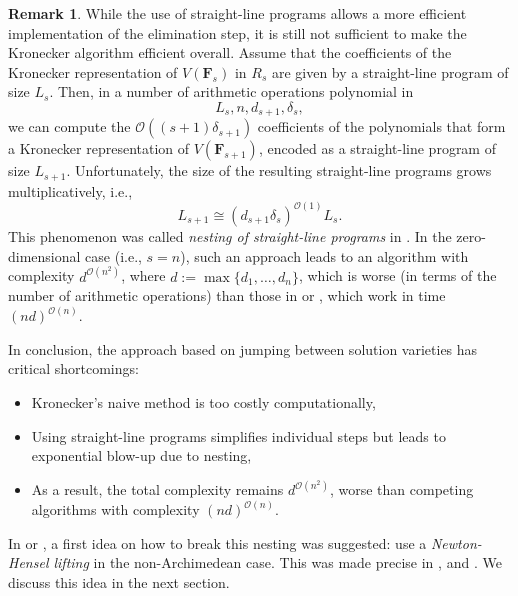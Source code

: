 \documentclass[pdflatex,sn-basic]{sn-jnl}%
\theoremstyle{thmstyleone}%
\theoremstyle{thmstyletwo}%
\theoremstyle{thmstylethree}%
\theoremstyle{definition}
\newtheorem{remark}[theorem]{Remark}
\numberwithin{equation}{section}
\newcommand{\bfs}{\boldsymbol}
\begin{document}
\begin{remark}
While the use of straight-line programs allows a more efficient
implementation of the elimination step, it is still not sufficient
to make the Kronecker algorithm efficient overall. Assume that the
coefficients of the Kronecker representation of $V(\bfs F_s)$ in
$R_s$ are given by a straight-line program of size $L_s$. Then, in a
number of arithmetic operations polynomial in
%
$$L_s,n,d_{s+1},\delta_s,$$
%
we can compute the $\mathcal{O}((s+1)\delta_{s+1})$ coefficients of the
polynomials that form a Kronecker representation of $V(\bfs
F_{s+1})$, encoded as a straight-line program of size $L_{s+1}$.
Unfortunately, the size of the resulting straight-line programs
grows multiplicatively, i.e.,
%
$$L_{s+1}\cong (d_{s+1}\delta_s)^{\mathcal{O}(1)}L_s.$$
%
This phenomenon was called {\em nesting of straight-line programs}
in \cite{Pardo95}. In the zero-dimensional case (i.e., $s=n$), such
an approach leads to an algorithm with complexity
$d^{\mathcal{O}(n^2)}$, where $d:=\max\{d_1,\ldots,d_n\}$, which is
worse (in terms of the number of arithmetic operations) than those
in \cite{FiGiSm95} or \cite{KrPa96}, which work in time
$(nd)^{\mathcal{O}(n)}$.
\end{remark}

In conclusion, the approach based on jumping between solution
varieties has critical shortcomings:
%
\begin{itemize}
  \item Kronecker's naive method is too costly computationally,
  \item Using straight-line
programs simplifies individual steps but leads to exponential
blow-up due to nesting,
  \item As a result, the total complexity remains
  $d^{\mathcal{O}(n^2)}$,
  worse than competing algorithms with complexity $(nd)^{\mathcal{O}(n)}$.
\end{itemize}

In \cite{Pardo95} or \cite{GiHeMoPa95}, a first idea on how to break
this nesting was suggested: use a {\em Newton-Hensel lifting} in the
non-Archimedean case. This was made precise in
\cite{GiHaHeMoMoPa97}, \cite{GiHeMoPa97} and \cite{GiHeMoMoPa98}. We
discuss this idea in the next section.
%
%
\end{document}
